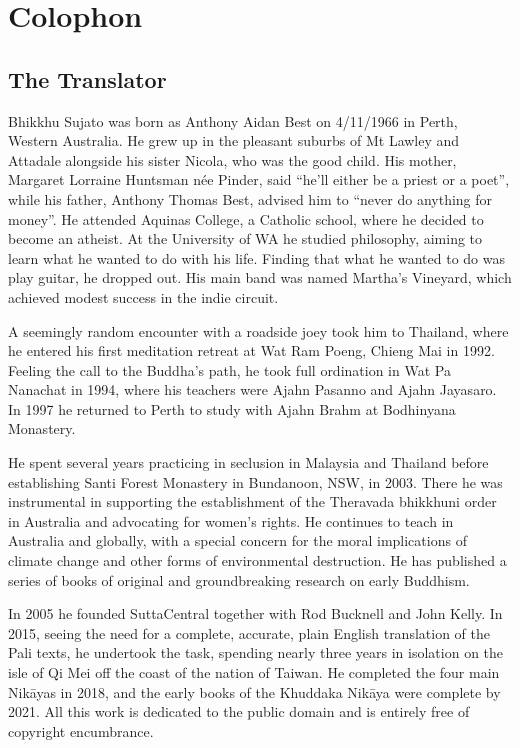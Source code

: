\documentclass[12pt,openany]{book}%
\let\oldbackmatter\backmatter
\renewcommand{\backmatter}{%
\chapterfont{\setstretch{.85}\normalfont\centering}%
\sectionfont{\setstretch{.85}\Semiboldsubheadfont}%
\oldbackmatter}
\begin{document}
%
\backmatter%
\chapter*{Colophon}

\section*{The Translator}

Bhikkhu Sujato was born as Anthony Aidan Best on 4/11/1966 in Perth, Western Australia. He grew up in the pleasant suburbs of Mt Lawley and Attadale alongside his sister Nicola, who was the good child. His mother, Margaret Lorraine Huntsman née Pinder, said “he’ll either be a priest or a poet”, while his father, Anthony Thomas Best, advised him to “never do anything for money”. He attended Aquinas College, a Catholic school, where he decided to become an atheist. At the University of WA he studied philosophy, aiming to learn what he wanted to do with his life. Finding that what he wanted to do was play guitar, he dropped out. His main band was named Martha’s Vineyard, which achieved modest success in the indie circuit. 

A seemingly random encounter with a roadside joey took him to Thailand, where he entered his first meditation retreat at Wat Ram Poeng, Chieng Mai in 1992. Feeling the call to the Buddha’s path, he took full ordination in Wat Pa Nanachat in 1994, where his teachers were Ajahn Pasanno and Ajahn Jayasaro. In 1997 he returned to Perth to study with Ajahn Brahm at Bodhinyana Monastery. 

He spent several years practicing in seclusion in Malaysia and Thailand before establishing Santi Forest Monastery in Bundanoon, NSW, in 2003. There he was instrumental in supporting the establishment of the Theravada bhikkhuni order in Australia and advocating for women’s rights. He continues to teach in Australia and globally, with a special concern for the moral implications of climate change and other forms of environmental destruction. He has published a series of books of original and groundbreaking research on early Buddhism. 

In 2005 he founded SuttaCentral together with Rod Bucknell and John Kelly. In 2015, seeing the need for a complete, accurate, plain English translation of the Pali texts, he undertook the task, spending nearly three years in isolation on the isle of Qi Mei off the coast of the nation of Taiwan. He completed the four main \textsanskrit{Nikāyas} in 2018, and the early books of the Khuddaka \textsanskrit{Nikāya} were complete by 2021. All this work is dedicated to the public domain and is entirely free of copyright encumbrance. 
\end{document}
